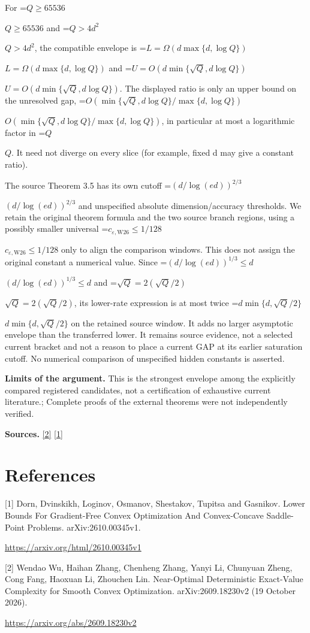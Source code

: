 \documentclass[10pt,a4paper]{article}
\newcommand{\AtlasMath}[1]{\par\begingroup\centering\setbox0=\hbox{$\displaystyle #1$}\ifdim\wd0>1.4\linewidth\typeout{ATLAS WIDE FORMULA: \the\wd0}\fi\ifdim\wd0>\linewidth\resizebox{\linewidth}{!}{\box0}\else\box0\fi\par\endgroup}
\newcommand{\AtlasInlineMath}[1]{\begingroup\setbox0=\hbox{$#1$}\ifdim\wd0>.4\linewidth\endgroup\AtlasMath{#1}\else\endgroup$#1$\fi}
\begin{document}
For \AtlasInlineMath{Q\ge65536} and \AtlasInlineMath{Q>4d^2}, the compatible envelope is \AtlasInlineMath{L=\Omega(d\max\{d,\log Q\})} and \AtlasInlineMath{U=O(d\min\{\sqrt Q,d\log Q\})}. The displayed ratio is only an upper bound on the unresolved gap, \AtlasInlineMath{O(\min\{\sqrt Q,d\log Q\}/\max\{d,\log Q\})}, in particular at most a logarithmic factor in \AtlasInlineMath{Q}. It need not diverge on every slice (for example, fixed d may give a constant ratio).

The source Theorem 3.5 has its own cutoff \AtlasInlineMath{(d/\log(ed))^{2/3}} and unspecified absolute dimension/accuracy thresholds. We retain the original theorem formula and the two source branch regions, using a possibly smaller universal \AtlasInlineMath{c_{\varepsilon,\mathrm{W26}}\le1/128} only to align the comparison windows. This does not assign the original constant a numerical value. Since \AtlasInlineMath{(d/\log(ed))^{1/3}\le d} and \AtlasInlineMath{\sqrt Q=2(\sqrt Q/2)}, its lower-rate expression is at most twice \AtlasInlineMath{d\min\{d,\sqrt Q/2\}} on the retained source window. It adds no larger asymptotic envelope than the transferred lower. It remains source evidence, not a selected current bracket and not a reason to place a current GAP at its earlier saturation cutoff. No numerical comparison of unspecified hidden constants is asserted.

\textbf{Limits of the argument.} This is the strongest envelope among the explicitly compared registered candidates, not a certification of exhaustive current literature.; Complete proofs of the external theorems were not independently verified.

\textbf{Sources.} \href{https://arxiv.org/abs/2609.18230v2}{[2]} \href{https://arxiv.org/html/2610.00345v1}{[1]}

\section{References}
[1] Dorn, Dvinskikh, Loginov, Osmanov, Shestakov, Tupitsa and Gasnikov. Lower Bounds For Gradient-Free Convex Optimization And Convex-Concave Saddle-Point Problems. arXiv:2610.00345v1.

\url{https://arxiv.org/html/2610.00345v1}

[2] Wendao Wu, Haihan Zhang, Chenheng Zhang, Yanyi Li, Chunyuan Zheng, Cong Fang, Haoxuan Li, Zhouchen Lin. Near-Optimal Deterministic Exact-Value Complexity for Smooth Convex Optimization. arXiv:2609.18230v2 (19 October 2026).

\url{https://arxiv.org/abs/2609.18230v2}
\end{document}
